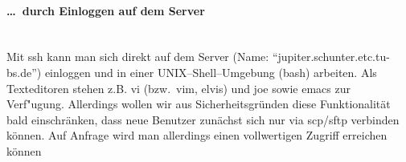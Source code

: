 \paragraph{\dots\ durch Einloggen auf dem Server} \ \\ 
Mit ssh  kann man sich direkt auf dem \glossar Server (Name: "`jupiter.schunter.etc.tu-bs.de"')
einloggen und in einer \glossar UNIX--Shell--Umgebung (bash) arbeiten. Als
Texteditoren stehen z.B. vi (bzw.\  vim, elvis) und joe sowie emacs zur
Verf"ugung. Allerdings wollen wir aus Sicherheitsgründen diese
Funktionalität bald einschränken, dass neue Benutzer zunächst sich nur
via scp/sftp verbinden können. Auf Anfrage wird man allerdings einen
vollwertigen Zugriff erreichen können





